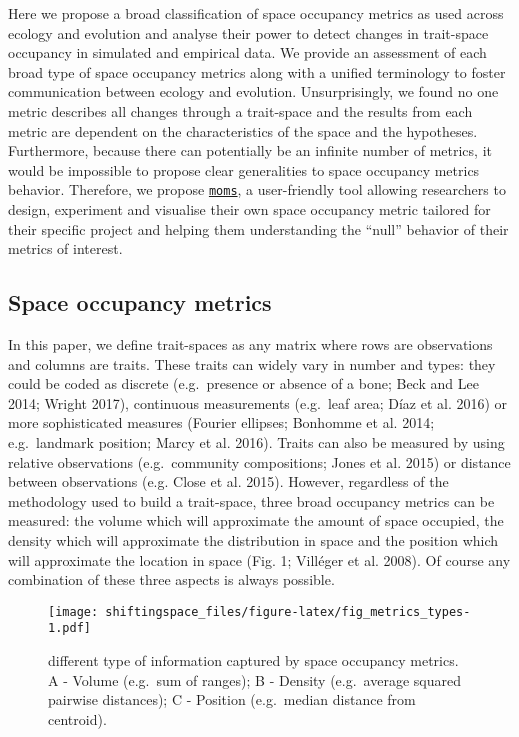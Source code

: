 \documentclass[]{article}
\begin{document}
Here we propose a broad classification of space occupancy metrics as
used across ecology and evolution and analyse their power to detect
changes in trait-space occupancy in simulated and empirical data. We
provide an assessment of each broad type of space occupancy metrics
along with a unified terminology to foster communication between ecology
and evolution. Unsurprisingly, we found no one metric describes all
changes through a trait-space and the results from each metric are
dependent on the characteristics of the space and the hypotheses.
Furthermore, because there can potentially be an infinite number of
metrics, it would be impossible to propose clear generalities to space
occupancy metrics behavior. Therefore, we propose
\href{https://tguillerme.shinyapps.io/moms/}{\texttt{moms}}, a
user-friendly tool allowing researchers to design, experiment and
visualise their own space occupancy metric tailored for their specific
project and helping them understanding the ``null'' behavior of their
metrics of interest.

\subsection{Space occupancy metrics}\label{space-occupancy-metrics}

In this paper, we define trait-spaces as any matrix where rows are
observations and columns are traits. These traits can widely vary in
number and types: they could be coded as discrete (e.g.~presence or
absence of a bone; Beck and Lee 2014; Wright 2017), continuous
measurements (e.g.~leaf area; Díaz et al. 2016) or more sophisticated
measures (Fourier ellipses; Bonhomme et al. 2014; e.g.~landmark
position; Marcy et al. 2016). Traits can also be measured by using
relative observations (e.g.~community compositions; Jones et al. 2015)
or distance between observations (e.g. Close et al. 2015). However,
regardless of the methodology used to build a trait-space, three broad
occupancy metrics can be measured: the volume which will approximate the
amount of space occupied, the density which will approximate the
distribution in space and the position which will approximate the
location in space (Fig. 1; Villéger et al. 2008). Of course any
combination of these three aspects is always possible.

\renewcommand\baselinestretch{1}\selectfont
\begin{figure}
\centering
\texttt{[image: shiftingspace\_files/figure-latex/fig\_metrics\_types-1.pdf]}
\caption{different type of information captured by space
occupancy metrics. A - Volume (e.g.~sum of ranges); B - Density
(e.g.~average squared pairwise distances); C - Position (e.g.~median
distance from centroid).}
\end{figure}
\renewcommand\baselinestretch{2}\selectfont
\end{document}
